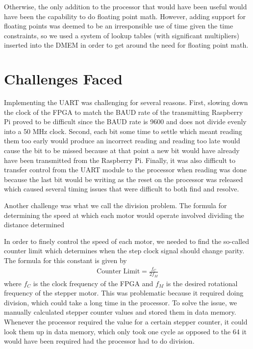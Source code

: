 \documentclass[12pt]{article}
\begin{document}
Otherwise, the only addition to the processor that would have been useful would have been the capability to do floating point math. However, adding support for floating points was deemed to be an irresponsible use of time given the time constraints, so we used a system of lookup tables (with significant multipliers) inserted into the DMEM in order to get around the need for floating point math.

\section{Challenges Faced}
Implementing the UART was challenging for several reasons. First, slowing down the clock of the FPGA to match the BAUD rate of the transmitting Raspberry Pi proved to be difficult since the BAUD rate is 9600 and does not divide evenly into a 50 MHz clock. Second, each bit some time to settle which meant reading them too early would produce an incorrect reading and reading too late would cause the bit to be missed because at that point a new bit would have already have been transmitted from the Raspberry Pi. Finally, it was also difficult to transfer control from the UART module to the processor when reading was done because the last bit would be writing as the reset on the processor was released which caused several timing issues that were difficult to both find and resolve.

Another challenge was what we call the division problem. The formula for determining the speed at which each motor would operate involved dividing the distance determined

In order to finely control the speed of each motor, we needed to find the so-called counter limit which determines when the step clock signal should change parity. The formula for this constant is given by
\begin{align}
\mbox{Counter Limit} = \frac{f_C}{2 f_M}
\end{align}
where $f_C$ is the clock frequency of the FPGA and $f_M$ is the desired rotational frequency of the stepper motor. This was problematic because it required doing division, which could take a long time in the processor. To solve the issue, we manually calculated stepper counter values and stored them in data memory. Whenever the processor required the value for a certain stepper counter, it could look them up in data memory, which only took one cycle as opposed to the 64 it would have been required had the processor had to do division.
\end{document}
